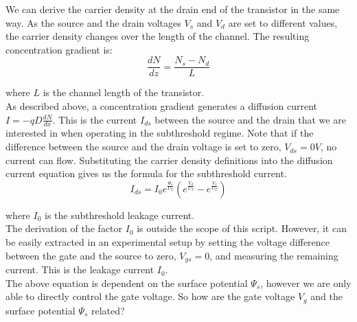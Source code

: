 We can derive the carrier density at the drain end of the transistor in the same way. As the source and the drain voltages $V_s$ and $V_d$ are set to different values, the carrier density changes over the length of the channel. The resulting concentration gradient is:\\

\begin{equation}
    \frac{dN}{dz} = \frac{N_s-N_d}{L}
\end{equation}

where $L$ is the channel length of the transistor.\\

As described above, a concentration gradient generates a diffusion current $I = -q D \frac{dN}{dx}$. This is the current $I_{ds}$ between the source and the drain that we are interested in when operating in the subthreshold regime. Note that if the difference between the source and the drain voltage is set to zero, $V_{ds} = 0V$, no current can flow. Substituting the carrier density definitions into the diffusion current equation gives us the formula for the subthreshold current.\\

\begin{equation}
    I_{ds} = I_0 e^{\frac{\Psi_s}{U_T}}(e^{\frac{V_d}{U_T}} - e^{\frac{V_s}{U_T}})
\end{equation}
\label{eq:ids_sub_psi}

where $I_0$ is the subthreshold leakage current.\\

The derivation of the factor $I_0$ is outside the scope of this script. However, it can be easily extracted in an experimental setup by setting the voltage difference between the gate and the source to zero, $V_{gs} = 0$, and measuring the remaining current. This is the leakage current $I_0$.\\

The above equation is dependent on the surface potential $\Psi_s$, however we are only able to directly control the gate voltage. So how are the gate voltage $V_g$ and the surface potential $\Psi_s$ related?\\

